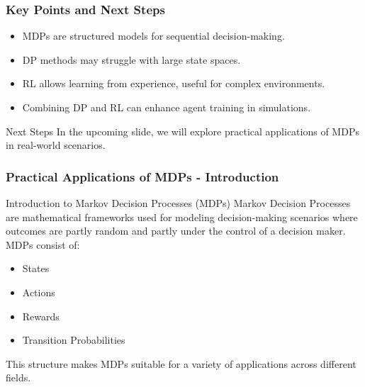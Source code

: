 \documentclass[aspectratio=169]{beamer}
\begin{document}
\begin{frame}[fragile]
    \frametitle{Key Points and Next Steps}
    \begin{itemize}
        \item MDPs are structured models for sequential decision-making.
        \item DP methods may struggle with large state spaces.
        \item RL allows learning from experience, useful for complex environments.
        \item Combining DP and RL can enhance agent training in simulations.
    \end{itemize}

    \begin{block}{Next Steps}
        In the upcoming slide, we will explore practical applications of MDPs in real-world scenarios.
    \end{block}
\end{frame}

\begin{frame}[fragile]
    \frametitle{Practical Applications of MDPs - Introduction}
    \begin{block}{Introduction to Markov Decision Processes (MDPs)}
        Markov Decision Processes are mathematical frameworks used for modeling decision-making scenarios where outcomes are partly random and partly under the control of a decision maker. MDPs consist of:
        \begin{itemize}
            \item States
            \item Actions
            \item Rewards
            \item Transition Probabilities
        \end{itemize}
        This structure makes MDPs suitable for a variety of applications across different fields.
    \end{block}
\end{frame}
\end{document}

